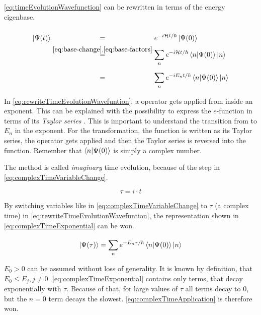 \autoref{eq:timeEvolutionWavefunction} can be rewritten in terms of the energy eigenbase.

\begin{equation}
    \label{eq:rewriteTimeEvolutionWavefuntion}
    \begin{split}
        \ket{\Psi(t)} &\stackrel{\phantom{\ref{eq:base-change}, \ref{eq:base-factors}}}{=} e^{-i\hamiltonian t / \hbar} \ket{\Psi(0)} \\
        &\stackrel{\ref{eq:base-change}, \ref{eq:base-factors}}{=}
        \sum\limits_{n}^{} e^{-i \hamiltonian t / \hbar} \bra{n}\ket{\Psi(0)} \ket{n}\\
        &\stackrel{\phantom{\ref{eq:base-change}, \ref{eq:base-factors}}}{=}
        \sum\limits_{n}^{} e^{-i E_n t / \hbar} \bra{n}\ket{\Psi(0)} \ket{n}
    \end{split}
\end{equation}

In \autoref{eq:rewriteTimeEvolutionWavefuntion}, a operator gets applied from inside an exponent. This can be explained with the possibility to express the $e$-function in terms of its \emph{Taylor series} \cite{schwablQM}. This is important to understand the transition from \hamiltonian to $E_n$ in the exponent. For the transformation, the function is written as its Taylor series, the operator gets applied and then the Taylor series is reversed into the function. Remember that $\bra{n}\ket{\Psi(0)}$ is simply a complex number.

The method is called \emph{imaginary} time evolution, because of the step in \autoref{eq:complexTimeVariableChange}.

\begin{equation}
    \label{eq:complexTimeVariableChange}
    \tau = i\cdot t
\end{equation}

By switching variables like in \autoref{eq:complexTimeVariableChange} to $\tau$ (a \glqq complex\grqq{} time) in \autoref{eq:rewriteTimeEvolutionWavefuntion}, the representation shown in \autoref{eq:complexTimeExponential} can be won.

\begin{equation}
    \label{eq:complexTimeExponential}
    \ket{\Psi(\tau)} = \sum\limits_{n}^{} e^{-E_n \tau / \hbar} \bra{n}\ket{\Psi(0)} \ket{n}
\end{equation}

$E_0 > 0$ can be assumed without loss of generality.
It is known by definition, that $E_0 \leq E_j, j\neq 0$. 
\autoref{eq:complexTimeExponential} contains only terms, that decay exponentially with $\tau$.
Because of that, for large values of $\tau$ all terms decay to 0, but the $n=0$ term decays the slowest. \autoref{eq:complexTimeApplication} is therefore won.

